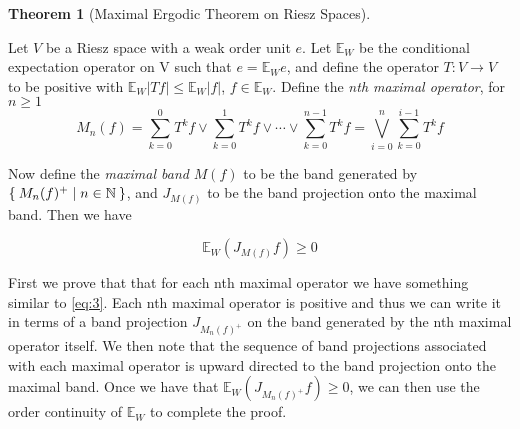 \documentclass[letterpaper,10pt,oneside,onecolumn,reqno]{amsart}
\newcommand{\E}{\mathbb E}
\newcommand{\NN}{\mathbb N}
\theoremstyle{definition}
\newtheorem{thm}{Theorem}
\newcommand{\join}{\vee}
\begin{document}
\begin{thm}[Maximal Ergodic Theorem on Riesz Spaces]\label{thr:3}

  Let $V$ be a Riesz space with a weak order unit $e$. Let
  $\E_W$ be the conditional expectation operator on V such that
  $e = \E_We$, and define the operator $T : V \to V$ to be
  positive with $\E_W|Tf| \leq \E_W|f|$, $f \in
  \E_W$. Define the \emph{nth
    maximal operator}, for $n \geq 1$
  \begin{equation}\label{eq:2}
    M_n(f) = \sum\limits_{k=0}^{0} T^kf \join \sum\limits_{k=0}^{1} T^kf \join \cdots \join \sum\limits_{k=0}^{n-1} T^kf = \bigvee_{i=0}^n \sum\limits_{k=0}^{i-1} T^kf
  \end{equation}

  Now define the \emph{maximal band} $M(f)$ to be
  the band generated by $\Set{M_n(f)^+ | n \in \NN}$, and $J_{M(f)}$
  to be the band projection onto the maximal band. Then we have

\begin{equation}\label{eq:3}
  \E_W(J_{M(f)}f) \geq 0
\end{equation}
\end{thm}

\begin{framed}
  First we prove that that for each nth maximal operator we have
  something similar to \eqref{eq:3}. Each nth maximal operator is
  positive and thus we can write it in terms of a band projection
  $J_{M_n(f)^+}$ on the band generated by the nth maximal operator
  itself. We then note that the sequence of band projections
  associated with each maximal operator is upward directed to the band
  projection onto the maximal band. Once we have that
  $\E_W(J_{M_n(f)^+}f) \geq 0$, we can then use the order
  continuity of $\E_W$ to complete the proof.
\end{framed}
\end{document}
